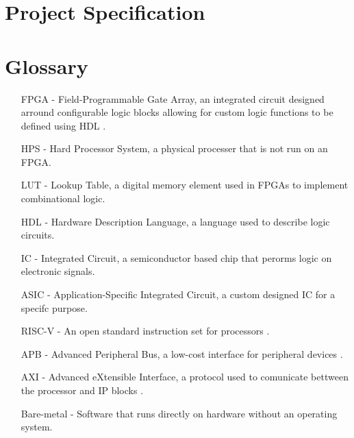 \documentclass[a4paper,fleqn,twoside,12pt]{article}
\begin{document}


\pagestyle{plain}





\appendix

\section{Project Specification}


\section{Glossary}
\begin{enumerate}
	\item [ FPGA - ] Field-Programmable Gate Array, an integrated circuit designed arround configurable logic blocks allowing for custom logic functions to be defined using HDL \cite{whatisanfpga}.
	\item [ HPS - ] Hard Processor System, a physical processer that is not run on an FPGA.
	\item [ LUT - ] Lookup Table, a digital memory element used in FPGAs to implement combinational logic.
	\item [ HDL - ] Hardware Description Language, a language used to describe logic circuits.
	\item [ IC - ] Integrated Circuit, a semiconductor based chip that perorms logic on electronic signals.
	\item [ ASIC - ] Application-Specific Integrated Circuit, a custom designed IC for a specifc purpose.
	\item [ RISC-V - ] An open standard instruction set for processors \cite{risc}.
	\item [ APB - ] Advanced Peripheral Bus, a low-cost interface for peripheral devices \cite{APB}.
	\item [ AXI - ]  Advanced eXtensible Interface, a protocol used to comunicate bettween the processor and IP blocks \cite{axi}.
	\item [ Bare-metal - ] Software that runs directly on hardware without an operating system.
\end{enumerate}



\end{document}
